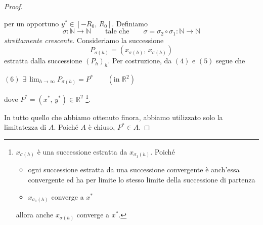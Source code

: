 \begin{proof}
\begin{center}
\end{center}
per un opportuno $y^* \in [-R_0,\,R_0]$. Definiamo
$$
\sigma : \mathbb{N} \longrightarrow \mathbb{N} \qquad \text{tale che} \qquad 
\sigma = \sigma_2 \circ \sigma_1 : \mathbb{N} \longrightarrow \mathbb{N}
$$
\emph{strettamente crescente}. Consideriamo la successione
$$
P_{\sigma(h)} = \left( x_{\sigma(h)},\,x_{\sigma(h)} \right)
$$
estratta dalla successione $(P_h)_h$. Per costruzione, da $\mathrm{(4)}$ e $\mathrm{(5)}$ segue che
\begin{center}
$\mathrm{(6)}$
\hfill
$\displaystyle
\exists \, \lim_{h \rightarrow \infty} P_{\sigma(h)} = P^* \qquad (\text{in } \mathbb{R}^2)
$
\hfill \null \\
\end{center}
dove $P^* = (x^*,\,y^*) \in \mathbb{R}^2$ \footnote
{$x_{\sigma(h)}$ è una successione estratta da $x_{\sigma_1(h)}$. Poiché
\begin{itemize}
\item ogni successione estratta da una successione convergente è anch'essa convergente ed ha per limite lo stesso limite della successione di partenza
\item $x_{\sigma_1(h)}$ converge a $x^*$
\end{itemize}
allora anche $x_{\sigma(h)}$ converge a $x^*$.
}.

In tutto quello che abbiamo ottenuto finora, abbiamo utilizzato solo la limitatezza di $A$. Poiché $A$ è chiuso, $P^* \in A$.
\end{proof}


